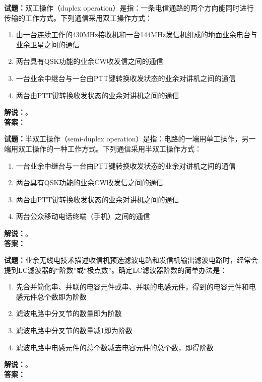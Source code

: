 \documentclass{ctexbook}
\begin{document}
\noindent\textbf{试题：}双工操作（duplex operation）是指：一条电信通路的两个方向能同时进行传输的工作方式。下列通信采用双工操作方式：
\begin{enumerate}[leftmargin=3em]
  \item 由一台连续工作的430\unit{\MHz}接收机和一台144\unit{\MHz}发信机组成的地面业余电台与业余卫星之间的通信
  \item 两台具有QSK功能的业余CW收发信之间的通信
  \item 一台业余中继台与一台由PTT键转换收发状态的业余对讲机之间的通信
  \item 两台由PTT键转换收发状态的业余对讲机之间的通信
\end{enumerate}
\noindent\textbf{解说：}\textbf{}。\\\noindent\textbf{答案：}

\vspace{\baselineskip}

\noindent\textbf{试题：}半双工操作（semi-duplex operation）是指：电路的一端用单工操作，另一端用双工操作的一种工作方式。下列通信采用半双工操作方式：
\begin{enumerate}[leftmargin=3em]
  \item 一台业余中继台与一台由PTT键转换收发状态的业余对讲机之间的通信
  \item 两台具有QSK功能的业余CW收发信之间的通信
  \item 两台由PTT键转换收发状态的业余对讲机之间的通信
  \item 两台公众移动电话终端（手机）之间的通信
\end{enumerate}
\noindent\textbf{解说：}\textbf{}。\\\noindent\textbf{答案：}

\vspace{\baselineskip}

\noindent\textbf{试题：}业余无线电技术描述收信机预选滤波电路和发信机输出滤波电路时，经常会提到LC滤波器的“阶数”或“极点数”。确定LC滤波器阶数的简单办法是：
\begin{enumerate}[leftmargin=3em]
  \item 先合并简化串、并联的电容元件或串、并联的电感元件，得到的电容元件和电感元件总个数即为阶数
  \item 滤波电路中分叉节的数量即为阶数
  \item 滤波电路中分叉节的数量减1即为阶数
  \item 滤波电路中电感元件的总个数减去电容元件的总个数，即得阶数
\end{enumerate}
\noindent\textbf{解说：}\textbf{}。\\\noindent\textbf{答案：}
\end{document}
